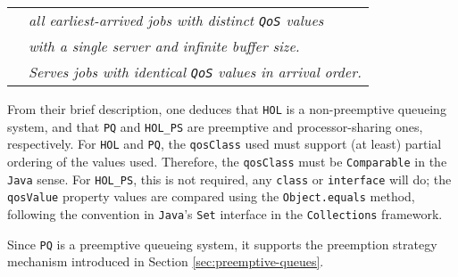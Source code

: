 \begin{table}[!htbp]
\begin{center}
\begin{tabular}{|l|l|}
              \\
              &
              {\em all earliest-arrived jobs with distinct \lstinline|QoS| values}
              \\
              &
              {\em with a single server and infinite buffer size.}
              \\
              &
              {\em Serves jobs with identical \lstinline|QoS|
                   values in arrival order.}
              \\
            \hline
		\end{tabular}
	\end{center}
\end{table}

From their brief description,
  one deduces that \lstinline|HOL|
  is a non-preemptive queueing system,
  and that \lstinline|PQ|
  and \lstinline|HOL_PS|
  are preemptive and processor-sharing ones,
  respectively.
For \lstinline|HOL| and \lstinline|PQ|,
  the \lstinline|qosClass| used must support
  (at least) partial ordering of the values used.
Therefore,
  the \lstinline|qosClass| must be \lstinline|Comparable|
  in the \lstinline|Java| sense.
For \lstinline|HOL_PS|, this is not required,
  any \lstinline|class|
  or \lstinline|interface| will do;
  the \lstinline|qosValue| property values
  are compared using the \lstinline|Object.equals|
  method,
  following the convention in \lstinline|Java|'s
  \lstinline|Set| interface in the
  \lstinline|Collections| framework.
  
Since \lstinline|PQ| is a preemptive queueing system,
  it supports the preemption strategy mechanism
  introduced in Section \ref{sec:preemptive-queues}.